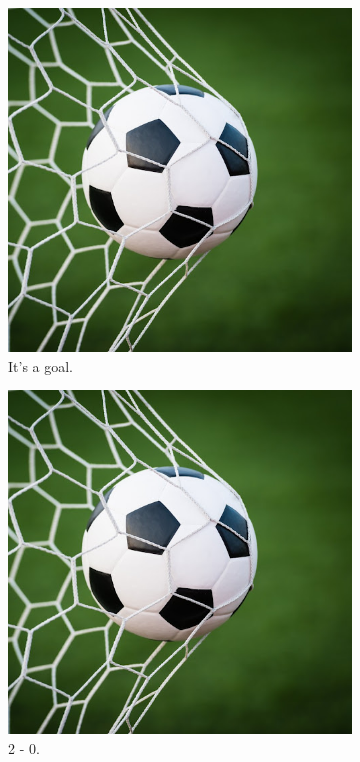\documentclass{article}
\begin{document}
	\begin{figure}[h!]
		\centering
		\begin{subfigure}[b]{0.4\linewidth}
			
			\includegraphics[width=\linewidth]{ball.jpg}
				\caption{It's a goal.}
		\end{subfigure}
		\begin{subfigure}[b]{0.4\linewidth}
			
			\includegraphics[width=\linewidth]{ball.jpg}
			\caption{2 - 0.}
		\end{subfigure}
		\begin{subfigure}[b]{0.4\linewidth}
			

\end{subfigure}
\end{figure}
\end{document}
